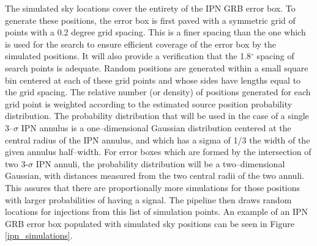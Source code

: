 The simulated sky locations cover the entirety of the IPN GRB error box. To generate these positions, the error box is first paved with a symmetric grid of points with a 0.2 degree grid spacing. This is a finer spacing than the one which is used for the search to ensure efficient coverage of the error box by the simulated positions. It will also provide a verification that the 1.8$^{\circ}$ spacing of search points is adequate.  Random positions are generated within a small square bin centered at each of these grid points and whose sides have lengths equal to the grid spacing. The relative number (or density) of positions generated for each grid point is weighted according to the estimated source position probability distribution. The probability distribution that will be used in the case of a single 3--$\sigma$ IPN annulus is a one--dimensional Gaussian distribution centered at the central radius of the IPN annulus, and which has a sigma of 1/3 the width of the given annulus half--width. For error boxes which are formed by the intersection of two 3-$\sigma$ IPN annuli, the probability distribution will be a two--dimensional Gaussian, with distances measured from the two central radii of the two annuli. This assures that there are proportionally more simulations for those positions with larger probabilities of having a signal. The pipeline then draws random locations for injections from this list of simulation points. An example of an IPN GRB error box populated with simulated sky positions can be seen in Figure \ref{ipn_simulations}.

